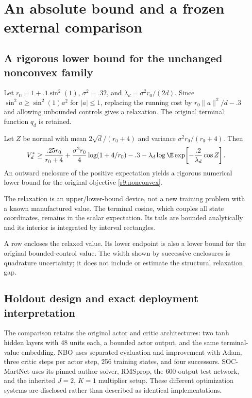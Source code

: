 \section{An absolute bound and a frozen external comparison}\label{r9:external}
\subsection{A rigorous lower bound for the unchanged nonconvex family}
Let $r_0=1+.1\sin^2(1)$, $\sigma^2=.32$, and $\lambda_d=\sigma^2r_0/(2d)$. Since $\sin^2a\geq\sin^2(1)a^2$ for $|a|\leq1$, replacing the running cost by $r_0\|a\|^2/d-.3$ and allowing unbounded controls gives a relaxation. The original terminal function $q_d$ is retained.
\begin{proposition}\label{r9:lower}
Let $Z$ be normal with mean $2\sqrt d/(r_0+4)$ and variance $\sigma^2r_0/(r_0+4)$. Then
\begin{equation}
 V_d^*\geq
 \frac{.25r_0}{r_0+4}+\frac{\sigma^2r_0}{4}\log(1+4/r_0)-.3
 -\lambda_d\log\E\exp\!\left[-\frac{.2}{\lambda_d}\cos Z\right].\label{r9:lowerformula}
\end{equation}
An outward enclosure of the positive expectation yields a rigorous numerical lower bound for the original objective \eqref{r9:nonconvex}.
\end{proposition}
The relaxation is an upper/lower-bound device, not a new training problem with a known manufactured value. The terminal cosine, which couples all state coordinates, remains in the scalar expectation. Its tails are bounded analytically and its interior is integrated by interval rectangles.

\begin{table}[t]
\centering\scriptsize
\caption{Absolute lower bounds for the original nonconvex control problem}\label{r9:tab:absolute}

\par\smallskip\footnotesize A row encloses the relaxed value. Its lower endpoint is also a lower bound for the original bounded-control value. The width shown by successive enclosures is quadrature uncertainty; it does not include or estimate the structural relaxation gap.
\end{table}

\subsection{Holdout design and exact deployment interpretation}
The comparison retains the original actor and critic architectures: two tanh hidden layers with 48 units each, a bounded actor output, and the same terminal-value embedding. NBO uses separated evaluation and improvement with Adam, three critic steps per actor step, 256 training states, and four successors. SOC-MartNet uses its pinned author solver, RMSprop, the 600-output test network, and the inherited $J=2$, $K=1$ multiplier setup. These different optimization systems are disclosed rather than described as identical implementations.

